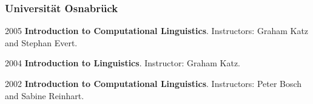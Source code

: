 \subsubsection*{Universit\"at Osnabr\"uck}
\begin{dated}
	\item[2005]  
		\textbf{Introduction to Computational Linguistics}. 
		Instructors: Graham Katz and Stephan Evert.
	\item[2004]
		\textbf{Introduction to Linguistics}. 
		Instructor: Graham Katz.
	\item[2002]
		\textbf{Introduction to Computational Linguistics}. 
		Instructors: Peter Bosch and Sabine Reinhart.
\end{dated}